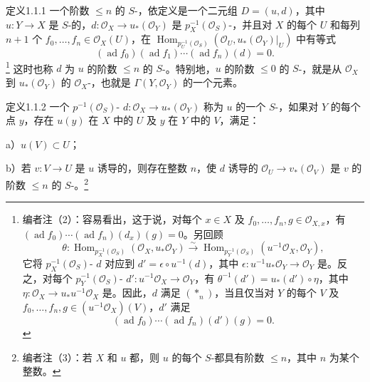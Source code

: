 \begin{SGAresult}{定义}{1.1.1}
一个阶数 $\leq n$ 的 $S$-，依定义是一个二元组 $D=(u,d)$，其中 $u:Y\to X$ 是 $S$-的，$d:\mathcal O_X\to u_*(\mathcal O_Y)$ 是 $p_X^{-1}(\mathcal O_S)$-，并且对 $X$ 的每个 $U$ 和每列 $n+1$ 个 $f_0,\ldots,f_n\in\mathcal O_X(U)$，在 $\operatorname{Hom}_{p_U^{-1}(\mathcal O_S)}(\mathcal O_U,u_*(\mathcal O_Y)|_U)$ 中有等式
\[
(\operatorname{ad}f_0)(\operatorname{ad}f_1)\cdots(\operatorname{ad}f_n)(d)=0.\tag{$*_n$}
\]
\footnote{编者注（2）：容易看出，这于说，对每个 $x\in X$ 及 $f_0,\ldots,f_n,g\in\mathcal O_{X,x}$，有 $(\operatorname{ad}f_0)\cdots(\operatorname{ad}f_n)(d_x)(g)=0$。另回顾
\[
\theta:\operatorname{Hom}_{p_X^{-1}(\mathcal O_S)}(\mathcal O_X,u_*\mathcal O_Y)\xrightarrow{\sim}\operatorname{Hom}_{p_Y^{-1}(\mathcal O_S)}(u^{-1}\mathcal O_X,\mathcal O_Y),
\]
它将 $p_X^{-1}(\mathcal O_S)$- $d$ 对应到 $d'=\epsilon\circ u^{-1}(d)$，其中 $\epsilon:u^{-1}u_*\mathcal O_Y\to\mathcal O_Y$ 是。反之，对每个 $p_Y^{-1}(\mathcal O_S)$- $d':u^{-1}\mathcal O_X\to\mathcal O_Y$，有 $\theta^{-1}(d')=u_*(d')\circ\eta$，其中 $\eta:\mathcal O_X\to u_*u^{-1}\mathcal O_X$ 是。因此，$d$ 满足 $(*_n)$，当且仅当对 $Y$ 的每个 $V$ 及 $f_0,\ldots,f_n,g\in(u^{-1}\mathcal O_X)(V)$，$d'$ 满足
\[
(\operatorname{ad}f_0)\cdots(\operatorname{ad}f_n)(d')(g)=0.\tag{$*'_n$}
\]}
这时也称 $d$ 为 $u$ 的阶数 $\leq n$ 的 $S$-。特别地，$u$ 的阶数 $\leq0$ 的 $S$-，就是从 $\mathcal O_X$ 到 $u_*(\mathcal O_Y)$ 的 $\mathcal O_X$-，也就是 $\Gamma(Y,\mathcal O_Y)$ 的一个元素。
\end{SGAresult}
\begin{SGAresult}{定义}{1.1.2}
一个 $p^{-1}(\mathcal O_S)$- $d:\mathcal O_X\to u_*(\mathcal O_Y)$ 称为 $u$ 的一个 $S$-，如果对 $Y$ 的每个点 $y$，存在 $u(y)$ 在 $X$ 中的 $U$ 及 $y$ 在 $Y$ 中的 $V$，满足：

 a）$u(V)\subset U$；

 b）若 $v:V\to U$ 是 $u$ 诱导的，则存在整数 $n$，使 $d$ 诱导的 $\mathcal O_U\to v_*(\mathcal O_V)$ 是 $v$ 的阶数 $\leq n$ 的 $S$-。\footnote{编者注（3）：若 $X$ 和 $u$ 都，则 $u$ 的每个 $S$-都具有阶数 $\leq n$，其中 $n$ 为某个整数。}
\end{SGAresult}
